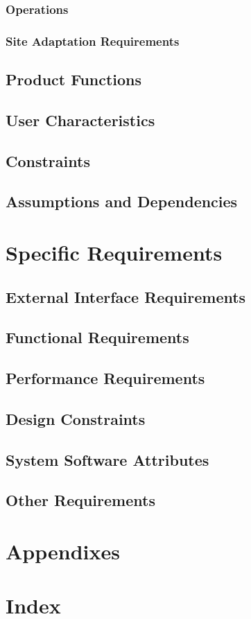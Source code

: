 \documentclass{article}
\begin{document}
        \subsubsection{Operations}
        \subsubsection{Site Adaptation Requirements}
    \subsection{Product Functions}
    \subsection{User Characteristics}
    \subsection{Constraints}
    \subsection{Assumptions and Dependencies}
\section{Specific Requirements}
    \subsection{External Interface Requirements}
    \subsection{Functional Requirements}
    \subsection{Performance Requirements}
    \subsection{Design Constraints}
    \subsection{System Software Attributes}
    \subsection{Other Requirements}
    
\section*{Appendixes}
\section*{Index}
\end{document}

